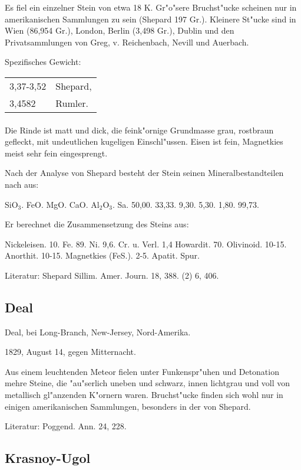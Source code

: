 \documentclass[a4paper, 11pt, oneside]{article}
\begin{document}
Es fiel ein einzelner Stein von etwa 18 K. Gr"o"sere Bruchst"ucke scheinen nur in amerikanischen Sammlungen zu sein (Shepard 197 Gr.). Kleinere St"ucke sind in Wien (86,954 Gr.), London, Berlin (3,498 Gr.), Dublin und den Privatsammlungen von Greg, v. Reichenbach, Nevill und Auerbach.

Spezifisches Gewicht:
\begin{table}[!ht]
    \centering
    \begin{tabular}{l l}
        3,37-3,52 & Shepard,\\
        3,4582 & Rumler.
    \end{tabular}
\end{table}
\paragraph{}
Die Rinde ist matt und dick, die feink"ornige Grundmasse grau, rostbraun gefleckt, mit undeutlichen kugeligen Einschl"ussen. Eisen ist fein, Magnetkies meist sehr fein eingesprengt.

Nach der Analyse von Shepard besteht der Stein seinen Mineralbestandteilen nach aus:

SiO$_{3}$. FeO. MgO. CaO. Al$_{2}$O$_{3}$. Sa.  
50,00. 33,33. 9,30. 5,30. 1,80. 99,73.

Er berechnet die Zusammensetzung des Steins aus:

Nickeleisen. 10. { Fe. 89. Ni. 9,6. Cr. u. Verl. 1,4 }  
Howardit. 70.  
Olivinoid. 10-15.  
Anorthit. 10-15.  
Magnetkies (FeS.). 2-5.  
Apatit. Spur.

Literatur: Shepard Sillim. Amer. Journ. 18, 388. (2) 6, 406.

\subsection{Deal}

Deal, bei Long-Branch, New-Jersey, Nord-Amerika.

1829, August 14, gegen Mitternacht.

Aus einem leuchtenden Meteor fielen unter Funkenspr"uhen und Detonation mehre Steine, die "au"serlich uneben und schwarz, innen lichtgrau und voll von metallisch gl"anzenden K"ornern waren. Bruchst"ucke finden sich wohl nur in einigen amerikanischen Sammlungen, besonders in der von Shepard.

Literatur: Poggend. Ann. 24, 228.

\subsection{Krasnoy-Ugol}
\end{document}
